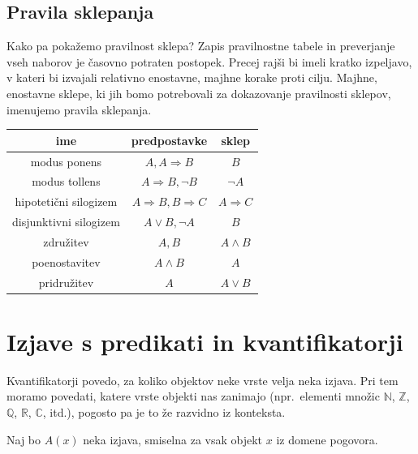 \documentclass[11pt,paper=b5,footinclude,headinclude]{scrbook} %
\begin{document}
\subsection{Pravila sklepanja}
Kako pa pokažemo pravilnost sklepa? Zapis
pravilnostne tabele in preverjanje vseh naborov je časovno potraten postopek. Precej
rajši bi imeli kratko izpeljavo, v kateri bi izvajali relativno enostavne, majhne korake
proti cilju.
Majhne, enostavne sklepe, ki jih bomo potrebovali za dokazovanje pravilnosti sklepov,
imenujemo pravila sklepanja.

\begin{tabular}{|c|c|c|}
	\hline 
	ime & predpostavke & sklep\\
	\hline 
	\hline 
	modus ponens & $A,A\Rightarrow B$ & $B$\\
	\hline 
	modus tollens & $A\Rightarrow B,\neg B$ & $\neg A$\\
	\hline 
	hipoteti\v{c}ni silogizem & $A\Rightarrow B,B\Rightarrow C$ & $A\Rightarrow C$\\
	\hline 
	disjunktivni silogizem & $A\vee B,\neg A$ & $B$\\
	\hline 
	združitev  & $A,B$ & $A\wedge B$\\
	\hline 
	poenostavitev & $A\wedge B$ & $A$\\
	\hline 
	pridružitev & $A$ & $A\vee B$\\
	\hline 
\end{tabular}

{
\section{Izjave s predikati in kvantifikatorji}
}

Kvantifikatorji povedo, za koliko objektov neke vrste velja neka izjava.
Pri tem moramo povedati, katere vrste objekti nas zanimajo (npr.~elementi množic $\mathbb{N}$, $\mathbb{Z}$, $\mathbb{Q}$, $\mathbb{R}$, $\mathbb{C}$, itd.), pogosto pa je to že razvidno iz konteksta.

Naj bo $A(x)$ neka izjava, smiselna za vsak objekt $x$ iz domene pogovora.
\iftoggle{long}{
{\color{blue}Taki izjavi pravimo \emph{ predikat}.
Predikati oblike $A(x)$ so enomestni. Poznamo pa tudi dvo- in večmestne predikate, npr.~$A(x,y)$, $P(x_1,x_2,x_3)$ ipd.}
}
{Taki izjavi pravimo \emph{ predikat}. Predikati oblike $A(x)$ so enomestni. Poznamo pa tudi dvo- in večmestne predikate, npr.~$A(x,y)$, $P(x_1,x_2,x_3)$ ipd.}
\end{document}
